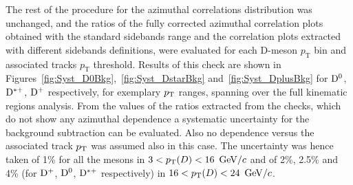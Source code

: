 The rest of the procedure for the azimuthal correlations distribution was unchanged, and the ratios of the fully corrected azimuthal correlation plots obtained with the standard sidebands range and the correlation plots extracted with different sidebands definitions, were evaluated for each D-meson $p_\text{T}$ bin and associated tracks $p_\text{T}$ threshold. Results of this check are shown in Figures~\ref{fig:Syst_D0Bkg},~\ref{fig:Syst_DstarBkg} and~\ref{fig:Syst_DplusBkg} for ${\rm D^0}$, ${\rm D^{*+}}$, ${\rm D^+}$ respectively, for exemplary $p_{\rm T}$ ranges, spanning over the full kinematic regions analysis. From the values of the ratios extracted from the checks, which do not show any azimuthal dependence a systematic uncertainty for the background subtraction can be evaluated. Also no dependence versus the associated track $p_{\rm T}$ was assumed also in this case. The uncertainty was hence taken of 1\% for all the mesons in $3 < p_{\rm T}(D) < 16$ $\mathrm{GeV}/c$ and of 2\%, 2.5\% and 4\% (for ${\rm D^+}$, ${\rm D^0}$, ${\rm D^{*+}}$ respectively) in $16 < p_{\rm T}(D) < 24$ $\mathrm{GeV}/c$.


